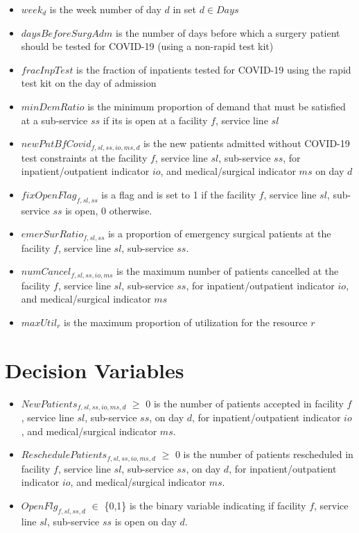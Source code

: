 \documentclass[10pt, letterpaper]{article}
\begin{document}
\begin{itemize}
\item[ ] $week_{d}$ is the week number of day $d$ in set $ d \in Days$
\item[ ] $daysBeforeSurgAdm$ is the number of days before which a surgery patient should be tested for COVID-19 (using a non-rapid test kit) 
\item[ ] $fracInpTest$ is the fraction of inpatients tested for COVID-19 using the rapid test kit on the day of admission 
\item[ ] $minDemRatio$ is the minimum proportion of demand that must be satisfied at a sub-service $ss$ if its is open at a facility $f$, service line $sl$ 
\item[ ] $newPntBfCovid_{f,sl,ss,io,ms,d}$ is the new patients admitted without COVID-19 test constraints at the facility $f$, service line $sl$, sub-service $ss$, for inpatient/outpatient indicator $io$, and medical/surgical indicator $ms$ on day $d$ 
\item[ ] $fixOpenFlag_{f,sl,ss}$ is a flag and is set to 1 if the facility $f$, service line $sl$, sub-service $ss$ is open, 0 otherwise. 
\item[ ] $emerSurRatio_{f,sl,ss}$ is a proportion of emergency surgical patients at the facility $f$, service line $sl$, sub-service $ss$. 
\item[ ] $numCancel_{f,sl,ss,io,ms}$ is the maximum number of patients cancelled at the facility $f$, service line $sl$, sub-service $ss$, for inpatient/outpatient indicator $io$, and medical/surgical indicator $ms$
\item[ ] $maxUtil_{r}$ is the maximum proportion of utilization for the resource $r$ 
\end{itemize}

\section*{Decision Variables}
\begin{itemize}
\item [ ] $NewPatients_{f,sl,ss,io,ms,d}$ $\geq$ {0} is the number of patients accepted in facility $f$, service line $sl$, sub-service $ss$, on day $d$, for inpatient/outpatient indicator $io$, and medical/surgical indicator $ms$.
\item [ ] $ReschedulePatients_{f,sl,ss,io,ms,d}$ $\geq$ {0} is the number of patients rescheduled in facility $f$, service line $sl$, sub-service $ss$, on day $d$, for inpatient/outpatient indicator $io$, and medical/surgical indicator $ms$.
\item [ ] $OpenFlg_{f,sl,ss,d}$ $\in$ \{0,1\} is the binary variable indicating if facility $f$, service line $sl$, sub-service $ss$ is open on day $d$.
\end{itemize}
\end{document}
